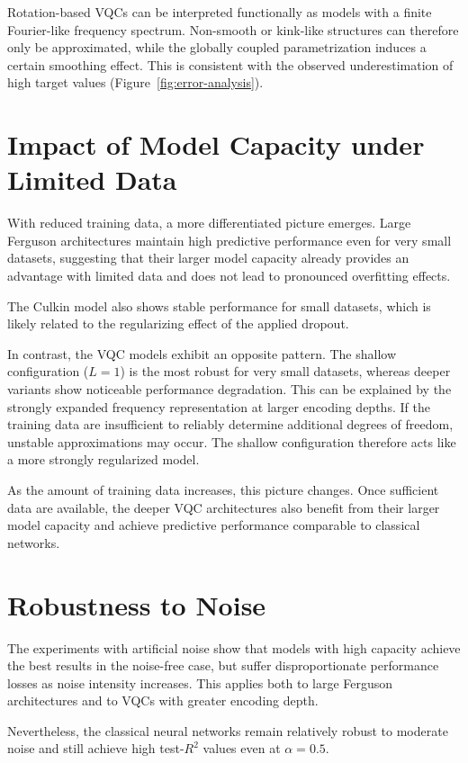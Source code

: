 Rotation-based VQCs can be interpreted functionally as models with a
finite Fourier-like frequency spectrum. Non-smooth or kink-like
structures can therefore only be approximated, while the globally
coupled parametrization induces a certain smoothing effect. This is
consistent with the observed underestimation of high target values
(Figure~\ref{fig:error-analysis}).

\section{Impact of Model Capacity under Limited Data}

With reduced training data, a more differentiated picture emerges.
Large Ferguson architectures maintain high predictive performance even
for very small datasets, suggesting that their larger model capacity
already provides an advantage with limited data and does not lead to
pronounced overfitting effects.

The Culkin model also shows stable performance for small datasets,
which is likely related to the regularizing effect of the applied
dropout.

In contrast, the VQC models exhibit an opposite pattern. The shallow
configuration ($L=1$) is the most robust for very small datasets,
whereas deeper variants show noticeable performance degradation. This
can be explained by the strongly expanded frequency representation at
larger encoding depths. If the training data are insufficient to
reliably determine additional degrees of freedom, unstable
approximations may occur. The shallow configuration therefore acts
like a more strongly regularized model.

As the amount of training data increases, this picture changes.
Once sufficient data are available, the deeper VQC architectures also
benefit from their larger model capacity and achieve predictive
performance comparable to classical networks.

\section{Robustness to Noise}

The experiments with artificial noise show that models with high
capacity achieve the best results in the noise-free case, but suffer
disproportionate performance losses as noise intensity increases. This
applies both to large Ferguson architectures and to VQCs with greater
encoding depth.

Nevertheless, the classical neural networks remain relatively robust
to moderate noise and still achieve high test-$R^2$ values even at
$\alpha = 0.5$.

